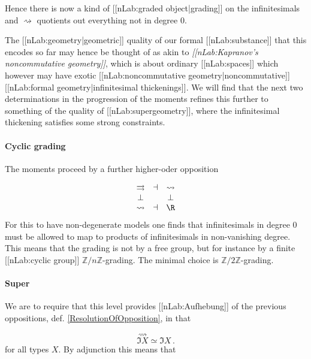 \documentclass[12pt,titlepage]{article}
\newcommand{\itexarray}[1]{\begin{matrix}#1\end{matrix}}
\theoremstyle{plain}
\theoremstyle{definition}
\theoremstyle{remark}
\begin{document}
Hence there is now a kind of [[nLab:graded object|grading]] on the infinitesimals and $\rightsquigarrow$ quotients out everything not in degree 0.

The [[nLab:geometry|geometric]] quality of our formal [[nLab:substance]] that this encodes so far may hence be thought of as akin to \emph{[[nLab:Kapranov's noncommutative geometry]]}, which is about ordinary [[nLab:spaces]] which however may have exotic [[nLab:noncommutative geometry|noncommutative]] [[nLab:formal geometry|infinitesimal thickenings]]. We will find that the next two determinations in the progression of the moments refines this further to something of the quality of [[nLab:supergeometry]], where the infinitesimal thickening satisfies some strong constraints.

\hypertarget{cyclic_grading}{}\paragraph*{{Cyclic grading}}\label{cyclic_grading}

The moments proceed by a further higher-oder opposition

\begin{displaymath}
\itexarray{
    \rightrightarrows &\dashv& \rightsquigarrow
    \\
    \bot && \bot
    \\
    \rightsquigarrow &\dashv& \R
  }
\end{displaymath}
For this to have non-degenerate models one finds that infinitesimals in degree 0 must be allowed to map to products of infinitesimals in non-vanishing degree. This means that the grading is not by a free group, but for instance by a finite [[nLab:cyclic group]] $\mathbb{Z}/n\mathbb{Z}$-grading. The minimal choice is $\mathbb{Z}/2\mathbb{Z}$-grading.

\hypertarget{FormalizationSuperGrading}{}\paragraph*{{Super}}\label{FormalizationSuperGrading}

We are to require that this level provides [[nLab:Aufhebung]] of the previous oppositions, def. \ref{ResolutionOfOpposition}, in that

\begin{displaymath}
\stackrel{\rightsquigarrow}{\Im X} \simeq \Im X
  \,.
\end{displaymath}
for all types $X$. By adjunction this means that
\end{document}
